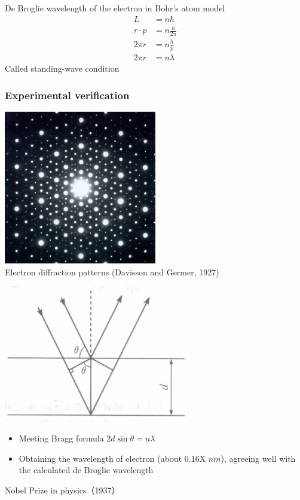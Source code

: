 \begin{frame}  
    \frame{}
    De Broglie wavelength of the electron in Bohr's atom model
    \begin{equation*}
        \begin{split}
            L&=n\hbar \\
            r \cdot p & =  n\frac{h}{2 \pi} \\
            2\pi r&=  n\frac{h}{p}\\
            2\pi r&=  n\lambda 
        \end{split} 
     \end{equation*}
     Called standing-wave condition 
\end{frame}


\begin{frame}   
  \frametitle{Experimental verification}
  \begin{center}
    \includegraphics[width=0.5\textwidth]{figs/elediffr.jpeg} \\
    Electron diffraction patterns (Davisson and Germer, 1927)
\end{center} 
\end{frame}
\begin{frame}   
    \begin{center}
      \includegraphics[width=0.6\textwidth]{figs/scatting.png} \\
    \end{center} 
    \begin{itemize}
        \item Meeting Bragg formula $2d\sin \theta=n\lambda $
        \item Obtaining the wavelength of electron (about 0.16X $nm$), agreeing well with the 
   calculated de Broglie wavelength 
    \end{itemize}
  {\color{deepred} Nobel Prize in physics（1937）}  
  \end{frame}

